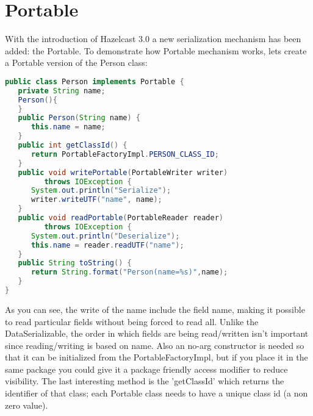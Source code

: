 \section{Portable}
With the introduction of Hazelcast 3.0 a new serialization mechanism has been added: the Portable. To demonstrate how Portable mechanism works, lets create a Portable version of the Person class:
\begin{lstlisting}[language=java]
public class Person implements Portable {
   private String name;
   Person(){
   }
   public Person(String name) {
      this.name = name;
   }
   public int getClassId() {
      return PortableFactoryImpl.PERSON_CLASS_ID;
   }
   public void writePortable(PortableWriter writer) 
         throws IOException {
      System.out.println("Serialize");
      writer.writeUTF("name", name);
   }
   public void readPortable(PortableReader reader) 
         throws IOException {
      System.out.println("Deserialize");
      this.name = reader.readUTF("name");
   }
   public String toString() {
      return String.format("Person(name=%s)",name);
   }
}
\end{lstlisting}
As you can see, the write of the name include the field name, making it possible to read particular fields without being forced to read all.  Unlike the DataSerializable, the order in which fields are being read/written isn't important since reading/writing is based  on name. Also an no-arg constructor is needed so that it can be initialized from the PortableFactoryImpl, but if you place it in the same package you could give it a package friendly access modifier to reduce visibility. The last interesting method is the 'getClassId' which returns the identifier of that class; each Portable class needs to have a unique class id (a non zero value).

